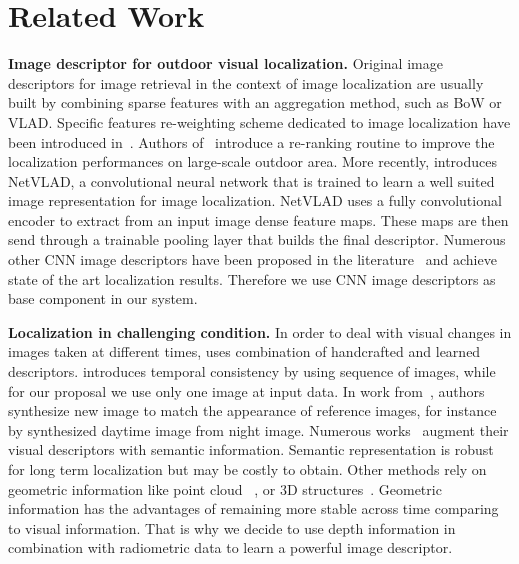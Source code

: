 \section{Related Work}
\label{sec:related_work}

\vspace{4pt}\noindent\textbf{Image descriptor for outdoor visual localization.} Original image descriptors for image retrieval in the context of image localization are usually built by combining sparse features with an aggregation method, such as BoW or VLAD. Specific features re-weighting scheme dedicated to image localization have been introduced in~\cite{Arandjelovic2014}. Authors of~\cite{Sattler2016} introduce a re-ranking routine to improve the localization performances on large-scale outdoor area. More recently, \cite{Arandjelovic2017} introduces NetVLAD, a convolutional neural network that is trained to learn a well suited image representation for image localization. NetVLAD uses a fully convolutional encoder to extract from an input image dense feature maps. These maps are then send through a trainable pooling layer that builds the final descriptor. Numerous other CNN image descriptors have been proposed in the literature~\cite{Kim2017a,Gordo2017,Radenovic2017,Sunderhauf2015a,Liu2018} and achieve state of the art localization results. Therefore we use CNN image descriptors as base component in our system.

\vspace{4pt}\noindent\textbf{Localization in challenging condition.} In order to deal with visual changes in images taken at different times, \cite{Naseer2018} uses combination of handcrafted and learned descriptors. \cite{Garg2018} introduces temporal consistency by using sequence of images, while for our proposal we use only one image at input data. In work from~\cite{Porav2018}, authors synthesize new image to match the appearance of reference images, for instance by synthesized daytime image from night image. Numerous works~\cite{Stenborg2018,Toft2018,Naseer2017a} augment their visual descriptors with semantic information. Semantic representation is robust for long term localization but may be costly to obtain. Other methods rely on geometric information like point cloud~\cite{Sattler2018,Schonberger2018} , or 3D structures~\cite{Torii2015}. Geometric information has the advantages of remaining more stable across time comparing to visual information. That is why we decide to use depth information in combination with radiometric data to learn a powerful image descriptor.


